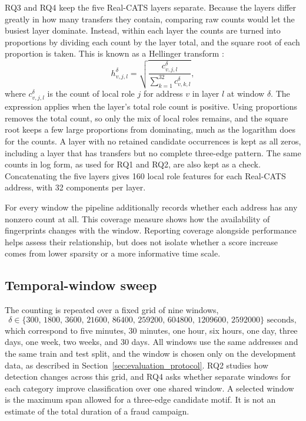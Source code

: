 RQ3 and RQ4 keep the five Real-CATS layers separate. Because the layers differ greatly
in how many transfers they contain, comparing raw counts would let the busiest
layer dominate. Instead, within each layer the counts are turned into proportions by dividing each
count by the layer total, and the square root of each proportion is taken. This is
known as a Hellinger transform \citep{legendre2001transformations}:
\[
    h_{v,j,l}^{\delta}
      = \sqrt{\frac{c_{v,j,l}^{\delta}}{\sum_{k=1}^{32}c_{v,k,l}^{\delta}}},
\]
where $c_{v,j,l}^{\delta}$ is the count of local role $j$ for address $v$ in
layer $l$ at window $\delta$. The expression applies when the layer's total
role count is positive. Using proportions removes the total count, so only
the mix of local roles remains, and
the square root keeps a few large proportions from dominating, much as the
logarithm does for the counts. A layer with no retained candidate occurrences is
kept as all zeros, including a layer that has transfers but no complete
three-edge pattern. The
same counts in log form, as used for RQ1 and RQ2, are also kept as a check.
Concatenating the five layers gives 160 local role features for each Real-CATS
address, with 32 components per layer.

For every window the pipeline additionally records whether each address has any
nonzero count at all. This coverage measure shows how the availability of
fingerprints changes with the window. Reporting coverage alongside performance
helps assess their relationship, but does not isolate whether a score increase
comes from lower sparsity or a more informative time scale.

\subsection{Temporal-window sweep}
\label{sec:temporal_window_sweep}

The counting is repeated over a fixed grid of nine windows,
\[
    \delta \in \{300,\,1800,\,3600,\,21600,\,86400,\,259200,\,604800,\,
                  1209600,\,2592000\}
    \text{ seconds},
\]
which correspond to five minutes, 30 minutes, one hour, six hours, one day, three
days, one week, two weeks, and 30 days. All windows use the same addresses and
the same train and test split, and the window is chosen only on the development
data, as described in Section~\ref{sec:evaluation_protocol}. RQ2 studies how
detection changes across this grid, and RQ4 asks whether separate windows for
each category improve classification over one shared window. A selected window
is the maximum span allowed for a three-edge candidate motif. It is not an estimate of the
total duration of a fraud campaign.
